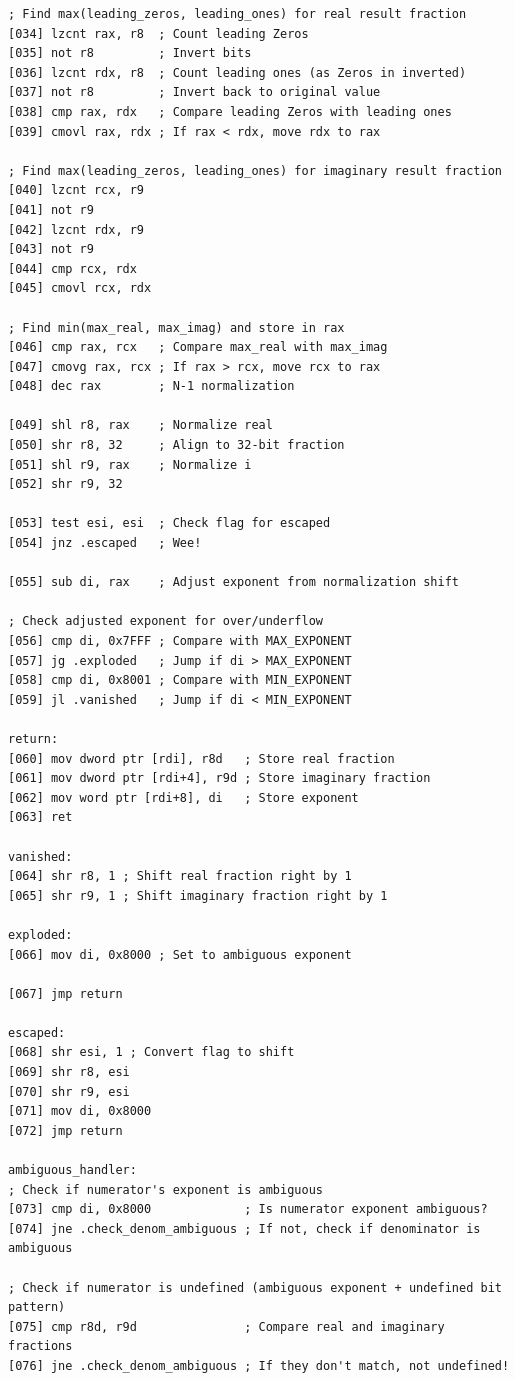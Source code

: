 \documentclass[12pt,letter]{article}
\begin{document}
\begin{lstlisting}[style=rust, caption={Complete Complex Division Assembly Implementation}, label={fig:circle_divide}]
; Find max(leading_zeros, leading_ones) for real result fraction
[034] lzcnt rax, r8  ; Count leading Zeros
[035] not r8         ; Invert bits
[036] lzcnt rdx, r8  ; Count leading ones (as Zeros in inverted)
[037] not r8         ; Invert back to original value
[038] cmp rax, rdx   ; Compare leading Zeros with leading ones
[039] cmovl rax, rdx ; If rax < rdx, move rdx to rax

; Find max(leading_zeros, leading_ones) for imaginary result fraction
[040] lzcnt rcx, r9
[041] not r9
[042] lzcnt rdx, r9
[043] not r9
[044] cmp rcx, rdx
[045] cmovl rcx, rdx

; Find min(max_real, max_imag) and store in rax
[046] cmp rax, rcx   ; Compare max_real with max_imag
[047] cmovg rax, rcx ; If rax > rcx, move rcx to rax
[048] dec rax        ; N-1 normalization

[049] shl r8, rax    ; Normalize real
[050] shr r8, 32     ; Align to 32-bit fraction
[051] shl r9, rax    ; Normalize i
[052] shr r9, 32

[053] test esi, esi  ; Check flag for escaped
[054] jnz .escaped   ; Wee!

[055] sub di, rax    ; Adjust exponent from normalization shift

; Check adjusted exponent for over/underflow
[056] cmp di, 0x7FFF ; Compare with MAX_EXPONENT
[057] jg .exploded   ; Jump if di > MAX_EXPONENT
[058] cmp di, 0x8001 ; Compare with MIN_EXPONENT
[059] jl .vanished   ; Jump if di < MIN_EXPONENT

return:
[060] mov dword ptr [rdi], r8d   ; Store real fraction
[061] mov dword ptr [rdi+4], r9d ; Store imaginary fraction
[062] mov word ptr [rdi+8], di   ; Store exponent
[063] ret

vanished:
[064] shr r8, 1 ; Shift real fraction right by 1
[065] shr r9, 1 ; Shift imaginary fraction right by 1

exploded:
[066] mov di, 0x8000 ; Set to ambiguous exponent

[067] jmp return

escaped:
[068] shr esi, 1 ; Convert flag to shift
[069] shr r8, esi                      
[070] shr r9, esi
[071] mov di, 0x8000
[072] jmp return

ambiguous_handler:
; Check if numerator's exponent is ambiguous
[073] cmp di, 0x8000             ; Is numerator exponent ambiguous?
[074] jne .check_denom_ambiguous ; If not, check if denominator is ambiguous

; Check if numerator is undefined (ambiguous exponent + undefined bit pattern)
[075] cmp r8d, r9d               ; Compare real and imaginary fractions
[076] jne .check_denom_ambiguous ; If they don't match, not undefined!


\end{lstlisting}
\end{document}
